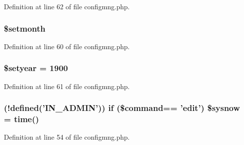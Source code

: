 Definition at line 62 of file configmng.\+php.

\hypertarget{configmng_8php_ad0fe74be5fde6d338d88cd0745d972ae}{
\subsubsection[{\$setmonth}]{\setlength{\rightskip}{0pt plus 5cm}\$setmonth}}\label{configmng_8php_ad0fe74be5fde6d338d88cd0745d972ae}


Definition at line 60 of file configmng.\+php.

\hypertarget{configmng_8php_ae3eb1622bafce3a8595259194b7ecb8d}{
\subsubsection[{\$setyear}]{\setlength{\rightskip}{0pt plus 5cm}\$setyear = 1900}}\label{configmng_8php_ae3eb1622bafce3a8595259194b7ecb8d}


Definition at line 61 of file configmng.\+php.

\hypertarget{configmng_8php_ac8e8c76dd2f202183e4a4d51f56afbfb}{
\subsubsection[{\$sysnow}]{ (!defined('{\bf I\+N\+\_\+\+A\+D\+M\+I\+N}')) {\bf if} (\$command== 'edit') \$sysnow = time()}}\label{configmng_8php_ac8e8c76dd2f202183e4a4d51f56afbfb}


Definition at line 54 of file configmng.\+php.

